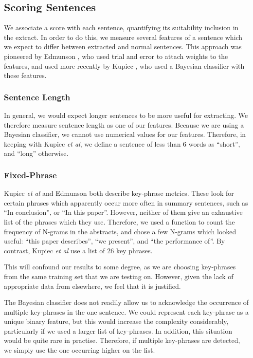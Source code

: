 \documentclass[a4paper, 10pt]{article}
\begin{document}
\subsection{Scoring Sentences}
We associate a score with each sentence, quantifying its suitability inclusion in the extract. In order to do this, we measure several features of a sentence which we expect to differ between extracted and normal sentences. This approach was pioneered by Edmunson \cite{edmunson69abstracting}, who used trial and error to attach weights to the features, and used more recently by Kupiec \cite{kupiec95trainable}, who used a Bayesian classifier with these features.

\subsubsection{Sentence Length}
In general, we would expect longer sentences to be more useful for extracting. We therefore measure sentence length as one of our features. Because we are using a Bayesian classifier, we cannot use numerical values for our features. Therefore, in keeping with Kupiec {\it et al}, we define a sentence of less than 6 words as ``short'', and ``long'' otherwise.

\subsubsection{Fixed-Phrase}
Kupiec {\it et al} and Edmunson both describe key-phrase metrics. These look for certain phrases which apparently occur more often in summary sentences, such as ``In conclusion'', or ``In this paper''. However, neither of them give an exhaustive list of the phrases which they use. Therefore, we used a function to count the frequency of N-grams in the abstracts, and chose a few N-grams which looked useful: ``this paper describes'', ``we present'', and ``the performance of''. By contrast, Kupiec {\it et al} use a list of 26 key phrases.

This will confound our results to some degree, as we are choosing key-phrases from the same training set that we are testing on. However, given the lack of appropriate data from elsewhere, we feel that it is justified.

The Bayesian classifier does not readily allow us to acknowledge the occurrence of multiple key-phrases in the one sentence. We could represent each key-phrase as a unique binary feature, but this would increase the complexity considerably, particularly if we used a larger list of key-phrases. In addition, this situation would be quite rare in practise. Therefore, if multiple key-phrases are detected, we simply use the one occurring higher on the list.
\end{document}
